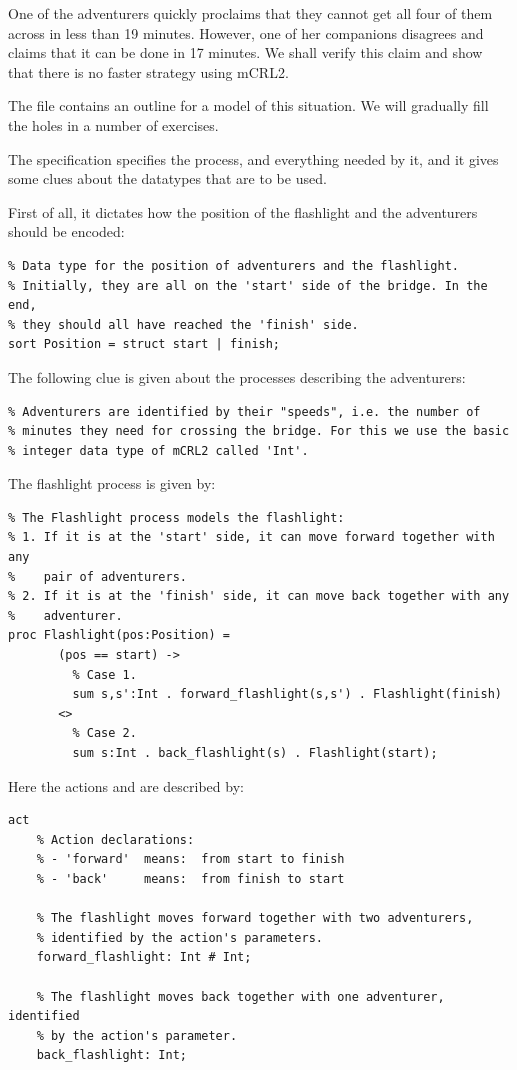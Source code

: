 \documentclass[11pt]{article}
\theoremstyle{myplain}
\theoremstyle{definition} %
\begin{document}
One of the adventurers quickly proclaims that they cannot get all four of them across in less than 19 minutes. However, one of her companions disagrees and claims that it can be done in 17 minutes. We shall verify this claim and show that there is no faster strategy using mCRL2.

The file  contains an outline for a model of this situation. We will gradually fill the holes in a number of exercises.

The specification specifies the  process, and everything needed by it, and it gives some clues about the datatypes that are to be used.

First of all, it dictates how the position of the flashlight and the adventurers should be encoded:

\begin{lstlisting}
% Data type for the position of adventurers and the flashlight.
% Initially, they are all on the 'start' side of the bridge. In the end,
% they should all have reached the 'finish' side.
sort Position = struct start | finish;
\end{lstlisting}

The following clue is given about the processes describing the adventurers:

\begin{lstlisting}
% Adventurers are identified by their "speeds", i.e. the number of
% minutes they need for crossing the bridge. For this we use the basic
% integer data type of mCRL2 called 'Int'.
\end{lstlisting}

The flashlight process is given by:

\begin{lstlisting}
% The Flashlight process models the flashlight:
% 1. If it is at the 'start' side, it can move forward together with any
%    pair of adventurers.
% 2. If it is at the 'finish' side, it can move back together with any
%    adventurer.
proc Flashlight(pos:Position) =
       (pos == start) ->
         % Case 1.
         sum s,s':Int . forward_flashlight(s,s') . Flashlight(finish)
       <> 
         % Case 2.
         sum s:Int . back_flashlight(s) . Flashlight(start);
\end{lstlisting}

Here the actions  and  are described by:

\begin{lstlisting}
act
    % Action declarations:
    % - 'forward'  means:  from start to finish
    % - 'back'     means:  from finish to start

    % The flashlight moves forward together with two adventurers,
    % identified by the action's parameters.
    forward_flashlight: Int # Int;

    % The flashlight moves back together with one adventurer, identified
    % by the action's parameter.
    back_flashlight: Int;
\end{lstlisting}
\end{document}
